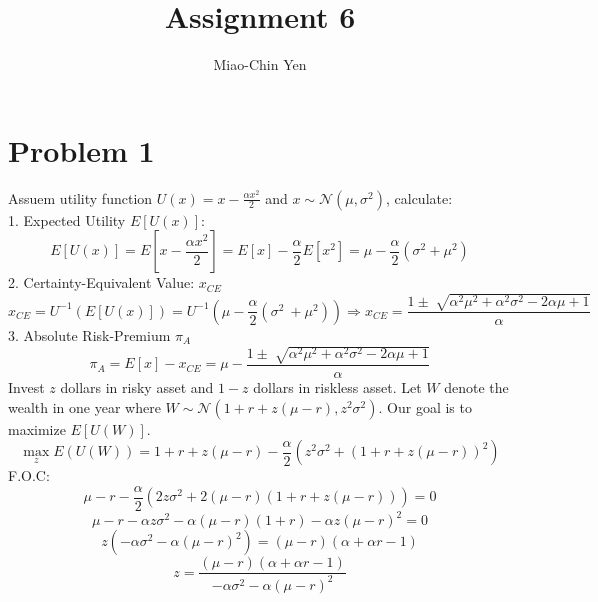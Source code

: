 \documentclass{article}
\title{Assignment 6}
\author{Miao-Chin Yen}
\begin{document}
\maketitle

\section*{Problem 1}
\hspace{1em}Assuem utility function $U(x) = x-\frac{\alpha x^2}{2}$ and $x \sim \mathcal{N}(\mu,\sigma^{2})$, calculate:\\
1. Expected Utility $E[U(x)]$:\\
$$E[U(x)] = E[x-\frac{\alpha x^2}{2}] = E[x]-\frac{\alpha}{2}E[x^2] = \mu-\frac{\alpha}{2}(\sigma^2 + \mu^2)$$
2. Certainty-Equivalent Value: $x_{CE}$
$$ x_{CE} = U^{-1}(E[U(x)]) = U^{-1}( \mu-\frac{\alpha}{2}(\sigma^2\ + \mu^2)) \Rightarrow x_{CE} = \frac{1 \pm\sqrt[]{\alpha^2\mu^2+\alpha^2\sigma^2-2\alpha\mu +1}}{\alpha}
$$
3. Absolute Risk-Premium $\pi_{A}$
$$\pi_{A} =E[x]-x_{CE} = \mu-\frac{1 \pm\sqrt[]{\alpha^2\mu^2+\alpha^2\sigma^2-2\alpha\mu +1}}{\alpha} $$
Invest $z$ dollars in risky asset and $1-z$ dollars in riskless asset. Let $W$ denote the wealth in one year where $W \sim \mathcal{N}(1+r+z(\mu-r),z^2\sigma^{2})$. 
Our goal is to maximize $E[U(W)]$.
$$ \max_{z} E(U(W)) = 1+r+z(\mu-r) -\frac{\alpha}{2}(z^2\sigma^{2} + (1+r+z(\mu-r))^2 )  $$
F.O.C:
$$ \mu-r -\frac{\alpha}{2}(2z\sigma^2 + 2(\mu-r)(1+r+z(\mu-r)))=0$$
$$\mu-r -\alpha z \sigma^2 -\alpha (\mu-r)(1+r)-\alpha z(\mu-r)^2 = 0$$
$$z(-\alpha \sigma^2 - \alpha(\mu-r)^2) = (\mu-r)(\alpha + \alpha r-1) $$
$$z= \frac{(\mu-r)(\alpha + \alpha r-1)}{-\alpha \sigma^2 - \alpha(\mu-r)^2}$$
\end{document}
